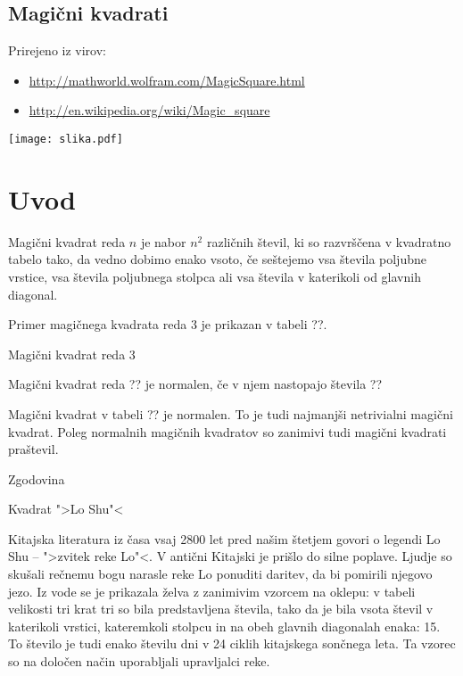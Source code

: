 \documentclass[a4paper,12pt]{article}
\begin{document}
\begin{center}
   \section*{Magični kvadrati}
\end{center}



Prirejeno iz virov:

\begin{itemize}
 \item \url{http://mathworld.wolfram.com/MagicSquare.html}
 \item \url{http://en.wikipedia.org/wiki/Magic_square} 
\end{itemize}
    
\texttt{[image: slika.pdf]}

\tableofcontents
\pagebreak
\section{Uvod}

   Magični kvadrat reda $n$ je nabor $n^2$ različnih števil,
   ki so razvrščena v kvadratno tabelo tako, da vedno dobimo enako vsoto,
   če seštejemo vsa števila poljubne vrstice, vsa števila poljubnega
   stolpca ali vsa števila v katerikoli od glavnih diagonal.

Primer magičnega kvadrata reda 3 je prikazan v tabeli ??.

Magični kvadrat reda 3

   Magični kvadrat reda ?? je normalen, če v njem nastopajo števila
   ??

Magični kvadrat v tabeli ?? je normalen.
To je tudi najmanjši netrivialni magični kvadrat.
Poleg normalnih magičnih kvadratov so zanimivi tudi magični kvadrati praštevil.


Zgodovina

Kvadrat ">Lo Shu"<

Kitajska literatura iz časa vsaj 2800 let pred našim štetjem govori o legendi
Lo Shu -- ">zvitek reke Lo"<. V antični Kitajski je prišlo do
silne poplave. Ljudje so skušali rečnemu bogu narasle reke Lo ponuditi daritev,
da bi pomirili njegovo jezo. Iz vode se je prikazala želva z zanimivim vzorcem
na oklepu: v tabeli velikosti tri krat tri so bila predstavljena števila, tako
da je bila vsota števil v katerikoli vrstici, kateremkoli stolpcu in na obeh
glavnih diagonalah enaka: 15. To število je tudi enako številu dni v 24 ciklih
kitajskega sončnega leta. Ta vzorec so na določen način uporabljali upravljalci
reke.
\end{document}
